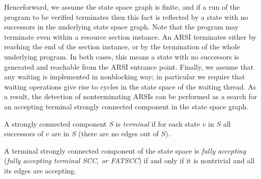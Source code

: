 Henceforward, we assume the state space graph is finite, and if a run of the
program to be verified terminates then this fact is reflected by a state with
no successors in the underlying state space graph. Note that the program may
terminate even within a resource section instance.
An ARSI terminates either by
reaching the end of the section instance, or by the termination of the whole
underlying program. In both cases, this means a state with no successors is
generated and reachable from the ARSI entrance point.
Finally, we assume that any waiting is implemented in nonblocking way; in
particular we require that waiting operations give rise to cycles in the state
space of the waiting thread.
As a result, the detection
of nonterminating ARSIs can be performed as a search for an accepting terminal
strongly connected component in the state space graph.


\begin{definition}
A strongly connected component $S$ is \emph{terminal} if for
each state $v$ in $S$ all successors of $v$ are in $S$ (there are no edges out
of $S$).

\end{definition}

\begin{definition}
A terminal strongly connected component of the state space is \emph{fully
  accepting} (\emph{fully accepting terminal SCC, or FATSCC}) if and only if it is nontrivial and all its edges are accepting.
\end{definition}


